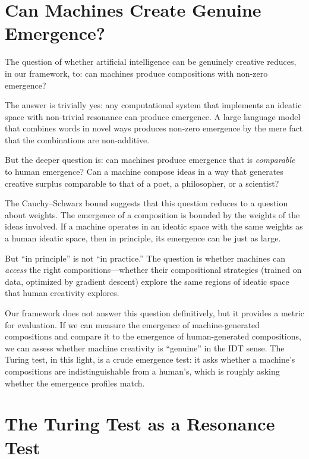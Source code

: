 \section{Can Machines Create Genuine Emergence?}

The question of whether artificial intelligence can be genuinely creative
reduces, in our framework, to: can machines produce compositions with non-zero
emergence?

The answer is trivially yes: any computational system that implements an ideatic
space with non-trivial resonance can produce emergence. A large language model
that combines words in novel ways produces non-zero emergence by the mere fact
that the combinations are non-additive.

But the deeper question is: can machines produce emergence that is
\emph{comparable} to human emergence? Can a machine compose ideas in a way
that generates creative surplus comparable to that of a poet, a philosopher,
or a scientist?

\begin{interpretation}
The Cauchy--Schwarz bound suggests that this question reduces to a question
about weights. The emergence of a composition is bounded by the weights of
the ideas involved. If a machine operates in an ideatic space with the same
weights as a human ideatic space, then in principle, its emergence can be
just as large.

But ``in principle'' is not ``in practice.'' The question is whether machines
can \emph{access} the right compositions---whether their compositional
strategies (trained on data, optimized by gradient descent) explore the same
regions of ideatic space that human creativity explores.

Our framework does not answer this question definitively, but it provides a
metric for evaluation. If we can measure the emergence of machine-generated
compositions and compare it to the emergence of human-generated compositions,
we can assess whether machine creativity is ``genuine'' in the IDT sense.
The Turing test, in this light, is a crude emergence test: it asks whether
a machine's compositions are indistinguishable from a human's, which is
roughly asking whether the emergence profiles match.
\end{interpretation}


\section{The Turing Test as a Resonance Test}

